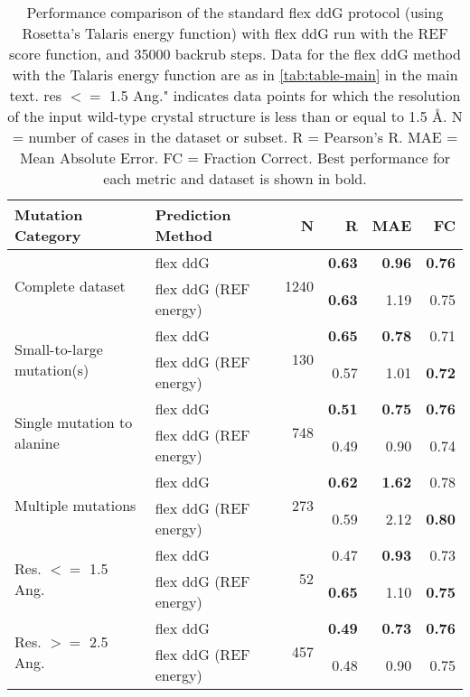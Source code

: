\begin{table}
  \begin{tabular}{llrrrr}
\toprule
Mutation Category &      Prediction Method &     N &    R &  MAE &   FC \\
\midrule
 \multirow{ 2}{*}{Complete dataset} & flex ddG & \multirow{ 2}{*}{1240} & \textbf{0.63} & \textbf{0.96} & \textbf{0.76}  \\
 & flex ddG (REF energy) & & \textbf{0.63} & 1.19 & 0.75  \\
\hline
 \multirow{ 2}{*}{Small-to-large mutation(s)} & flex ddG & \multirow{ 2}{*}{130} & \textbf{0.65} & \textbf{0.78} & 0.71  \\
 & flex ddG (REF energy) & & 0.57 & 1.01 & \textbf{0.72}  \\
\hline
 \multirow{ 2}{*}{Single mutation to alanine} & flex ddG & \multirow{ 2}{*}{748} & \textbf{0.51} & \textbf{0.75} & \textbf{0.76}  \\
 & flex ddG (REF energy) & & 0.49 & 0.90 & 0.74  \\
\hline
 \multirow{ 2}{*}{Multiple mutations} & flex ddG & \multirow{ 2}{*}{273} & \textbf{0.62} & \textbf{1.62} & 0.78  \\
 & flex ddG (REF energy) & & 0.59 & 2.12 & \textbf{0.80}  \\
\hline
 \multirow{ 2}{*}{Res. $<=$ 1.5 Ang.} & flex ddG & \multirow{ 2}{*}{52} & 0.47 & \textbf{0.93} & 0.73  \\
 & flex ddG (REF energy) & & \textbf{0.65} & 1.10 & \textbf{0.75}  \\
\hline
 \multirow{ 2}{*}{Res. $>=$ 2.5 Ang.} & flex ddG & \multirow{ 2}{*}{457} & \textbf{0.49} & \textbf{0.73} & \textbf{0.76}  \\
 & flex ddG (REF energy) & & 0.48 & 0.90 & 0.75  \\
\bottomrule
\end{tabular}
  \caption[REF results]{
    Performance comparison of the standard flex ddG protocol (using Rosetta's Talaris energy function) with flex ddG run with the REF score function, and 35000 backrub steps. Data for the flex ddG method with the Talaris energy function are as in \cref{tab:table-main} in the main text. res $<=$ 1.5 Ang." indicates data points for which the resolution of the input wild-type crystal structure is less than or equal to 1.5 \AA. N = number of cases in the dataset or subset. R = Pearson's R. MAE = Mean Absolute Error. FC = Fraction Correct. Best performance for each metric and dataset is shown in bold.
  } \label{tab:table-ref}
\end{table}
